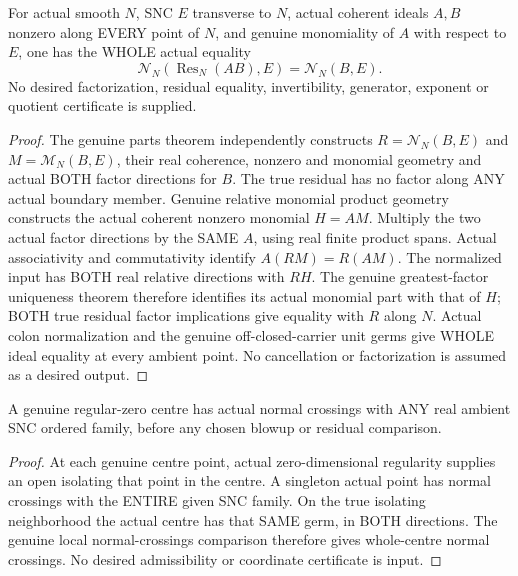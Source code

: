 \begin{theorem}
\label{hir:sharp-actual-whole-monomial-product-residual}
\leanok
For actual smooth $N$, SNC $E$ transverse to $N$, actual coherent ideals
$A,B$ nonzero along EVERY point of $N$, and genuine monomiality of $A$
with respect to $E$, one has the WHOLE actual equality
\[
 \mathcal N_N(\operatorname{Res}_N(A B),E)=\mathcal N_N(B,E).
\]
No desired factorization, residual equality, invertibility, generator,
exponent or quotient certificate is supplied.
\end{theorem}
\begin{proof}
The genuine parts theorem independently constructs $R=\mathcal N_N(B,E)$
and $M=\mathcal M_N(B,E)$, their real coherence, nonzero and monomial
geometry and actual BOTH factor directions for $B$. The true residual has
no factor along ANY actual boundary member. Genuine relative monomial
product geometry constructs the actual coherent nonzero monomial
$H=A M$. Multiply the two actual factor directions by the SAME $A$,
using real finite product spans. Actual associativity and commutativity
identify $A(RM)=R(AM)$. The normalized input has BOTH real relative
directions with $R H$. The genuine greatest-factor uniqueness theorem
therefore identifies its actual monomial part with that of $H$; BOTH
true residual factor implications give equality with $R$ along $N$.
Actual colon normalization and the genuine off-closed-carrier unit germs
give WHOLE ideal equality at every ambient point. No cancellation or
factorization is assumed as a desired output.
\end{proof}

\begin{lemma}
\label{hir:sharp-actual-discrete-centre-whole-family-normal-crossings}
\leanok
A genuine regular-zero centre has actual normal crossings with ANY real
ambient SNC ordered family, before any chosen blowup or residual comparison.
\end{lemma}
\begin{proof}
At each genuine centre point, actual zero-dimensional regularity supplies
an open isolating that point in the centre. A singleton actual point has
normal crossings with the ENTIRE given SNC family. On the true isolating
neighborhood the actual centre has that SAME germ, in BOTH directions.
The genuine local normal-crossings comparison therefore gives whole-centre
normal crossings. No desired admissibility or coordinate certificate is input.
\end{proof}

